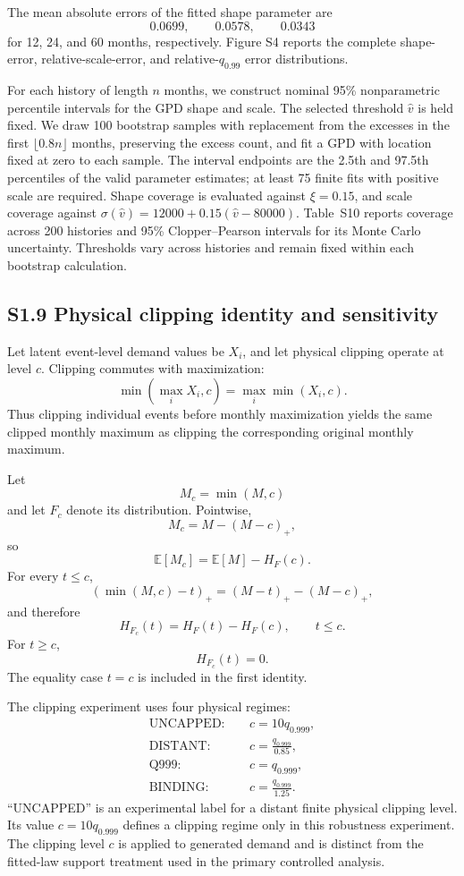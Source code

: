 \documentclass[]{interact}
\begin{document}
The mean absolute errors of the fitted shape parameter are
\[
0.0699,\qquad
0.0578,\qquad
0.0343
\]
for 12, 24, and 60 months, respectively. Figure S4 reports the
complete shape-error, relative-scale-error, and relative-\(q_{0.99}\)
error distributions.

\FloatBarrier

For each history of length \(n\) months, we construct nominal 95\%
nonparametric percentile intervals for the GPD shape and scale.
The selected threshold \(\widehat v\) is held fixed. We draw 100
bootstrap samples with replacement from the excesses in the first
\(\lfloor0.8n\rfloor\) months, preserving the excess count, and fit
a GPD with location fixed at zero to each sample. The interval
endpoints are the 2.5th and 97.5th percentiles of the valid parameter
estimates; at least 75 finite fits with positive scale are required.
Shape coverage is evaluated against \(\xi=0.15\), and scale coverage
against \(\sigma(\widehat v)=12000+0.15(\widehat v-80000)\).
Table~S10 reports coverage across 200 histories and 95\%
Clopper--Pearson intervals for its Monte Carlo uncertainty.
Thresholds vary across histories and remain fixed within each
bootstrap calculation.



\subsection*{S1.9 Physical clipping identity and sensitivity}

Let latent event-level demand values be \(X_i\), and let physical
clipping operate at level \(c\). Clipping commutes with maximization:
\[
\min\left(\max_iX_i,c\right)
=
\max_i\min(X_i,c).
\]
Thus clipping individual events before monthly maximization yields the
same clipped monthly maximum as clipping the corresponding original
monthly maximum.

Let
\[
M_c=\min(M,c)
\]
and let \(F_c\) denote its distribution. Pointwise,
\[
M_c=M-(M-c)_+,
\]
so
\[
\mathbb E[M_c]
=
\mathbb E[M]-H_F(c).
\]
For every \(t\leq c\),
\[
(\min(M,c)-t)_+
=
(M-t)_+-(M-c)_+,
\]
and therefore
\[
H_{F_c}(t)
=
H_F(t)-H_F(c),
\qquad
t\leq c.
\]
For \(t\geq c\),
\[
H_{F_c}(t)=0.
\]
The equality case \(t=c\) is included in the first identity.

The clipping experiment uses four physical regimes:
\[
\begin{aligned}
\mathrm{UNCAPPED}:&
\quad c=10q_{0.999},
\\
\mathrm{DISTANT}:&
\quad c=\frac{q_{0.999}}{0.85},
\\
\mathrm{Q999}:&
\quad c=q_{0.999},
\\
\mathrm{BINDING}:&
\quad c=\frac{q_{0.999}}{1.25}.
\end{aligned}
\]
``UNCAPPED'' is an experimental label for a distant finite physical
clipping level. Its value \(c=10q_{0.999}\) defines a clipping regime
only in this robustness experiment. The clipping level \(c\) is
applied to generated demand and is distinct from the fitted-law support
treatment used in the primary controlled analysis.
\end{document}

